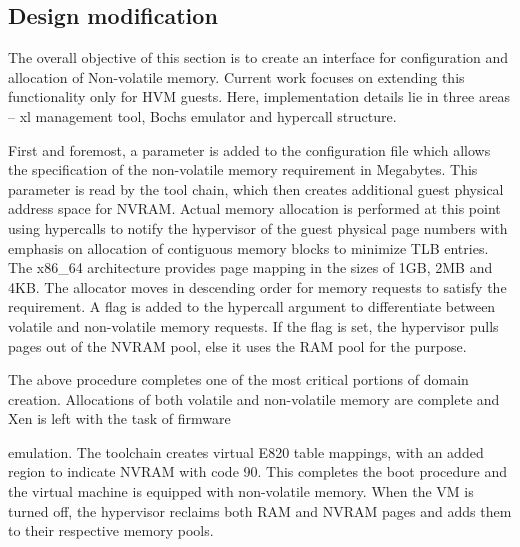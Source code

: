 \subsection{Design modification}
The overall objective of this section is to create an interface for configuration and allocation of Non-volatile memory. Current work focuses on extending this functionality only for HVM guests. Here, implementation details lie in three areas – xl management tool, Bochs emulator and hypercall structure.

First and foremost, a parameter is added to the configuration file which allows the specification of the non-volatile memory requirement in Megabytes. This parameter is read by the tool chain, which then creates additional guest physical address space for NVRAM. Actual memory allocation is performed at this point using hypercalls to notify the hypervisor of the guest physical page numbers with emphasis on allocation of contiguous memory blocks to minimize TLB entries. The x86\_64 architecture provides page mapping in the sizes of 1GB, 2MB and 4KB. The allocator moves in descending order for memory requests to satisfy the requirement. A flag is added to the hypercall argument to differentiate between volatile and non-volatile memory requests. If the flag is set, the hypervisor pulls pages out of the NVRAM pool, else it uses the RAM pool for the purpose.

The above procedure completes one of the most critical portions of domain creation. Allocations of both volatile and non-volatile memory are complete and Xen is left with the task of firmware

emulation. The toolchain creates virtual E820 table mappings, with an added region to indicate NVRAM with code 90. This completes the boot procedure and the virtual machine is equipped with non-volatile memory. When the VM is turned off, the hypervisor reclaims both RAM and NVRAM pages and adds them to their respective memory pools. 
